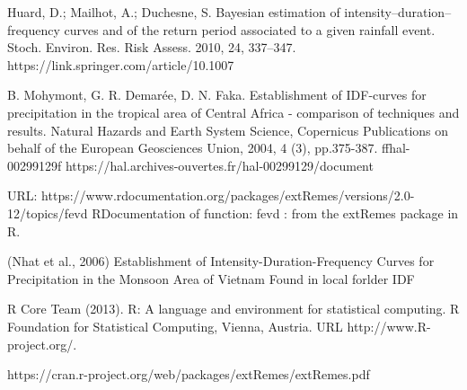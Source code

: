 \begin{thebibliography}{9}
Huard, D.; Mailhot, A.; Duchesne, S. Bayesian estimation of intensity–duration–frequency curves and of
the return period associated to a given rainfall event. Stoch. Environ. Res. Risk Assess. 2010, 24, 337–347.
https://link.springer.com/article/10.1007%

B. Mohymont, G. R. Demarée, D. N. Faka. Establishment of IDF-curves for precipitation in the
tropical area of Central Africa - comparison of techniques and results. Natural Hazards and Earth
System Science, Copernicus Publications on behalf of the European Geosciences Union, 2004, 4 (3),
pp.375-387. ffhal-00299129f
https://hal.archives-ouvertes.fr/hal-00299129/document

URL: https://www.rdocumentation.org/packages/extRemes/versions/2.0-12/topics/fevd
RDocumentation of function: fevd : from the extRemes package in R.

(Nhat et al., 2006)
Establishment of Intensity-Duration-Frequency Curves
for Precipitation in the Monsoon Area of Vietnam
Found in local forlder IDF

R Core Team (2013). R: A language and environment for statistical
computing. R Foundation for Statistical Computing, Vienna, Austria.
URL http://www.R-project.org/.

https://cran.r-project.org/web/packages/extRemes/extRemes.pdf


\end{thebibliography} 